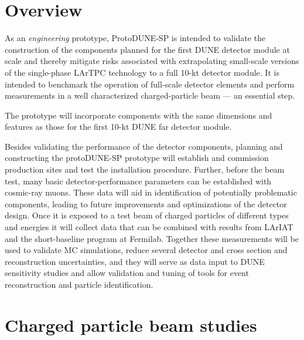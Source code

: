 
\section{Overview}

As an \textit{engineering} prototype, ProtoDUNE-SP is
intended to validate the construction of the components planned for the
first DUNE  detector module at scale and thereby mitigate
risks associated with extrapolating small-scale versions of the
single-phase LArTPC technology to a full 10-kt detector module.  It is
intended to benchmark the operation of full-scale detector
elements and perform measurements in a well characterized
charged-particle beam --- an essential step.

The prototype will incorporate components with the same
dimensions and features as those for the first 10-kt DUNE far detector
module.

Besides validating the performance of the detector components,
planning and constructing the protoDUNE-SP prototype will establish and
commission production sites and test the installation procedure.
Further, before the beam test, many basic detector-performance
parameters can be established with cosmic-ray muons.  These data will
aid in identification of potentially problematic components, leading
to future improvements and optimizations of the detector design.  Once
it is exposed to a test beam of charged particles of different types
and energies it will collect data that can be combined with results
from LArIAT and the short-baseline program at Fermilab.  Together
these measurements will be used to validate MC simulations, reduce several detector and cross section and reconstruction uncertainties, and they
will serve as data input to DUNE sensitivity studies and allow
validation and tuning of tools for event reconstruction and particle
identification.

\section{Charged particle beam studies}

